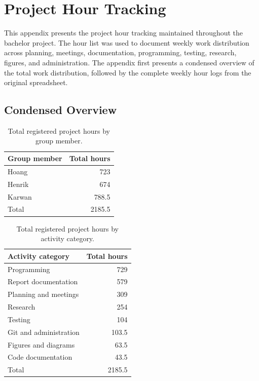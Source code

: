 
\chapter{Project Hour Tracking}
\label{app:project-hour-tracking}
\raggedbottom

This appendix presents the project hour tracking maintained throughout the bachelor project. The hour list was used to document weekly work distribution across planning, meetings, documentation, programming, testing, research, figures, and administration. The appendix first presents a condensed overview of the total work distribution, followed by the complete weekly hour logs from the original spreadsheet.

\section{Condensed Overview}
\label{appendix:project-hour-tracking-overview}

\begin{table}[htbp]
\centering
\caption{Total registered project hours by group member.}
\label{tab:project-hours-member-total}
\begin{tabular}{lr}
\toprule
Group member & Total hours \\
\midrule
Hoang & 723 \\
Henrik & 674 \\
Karwan & 788.5 \\
\midrule
Total & 2185.5 \\
\bottomrule
\end{tabular}
\end{table}

\begin{table}[htbp]
\centering
\caption{Total registered project hours by activity category.}
\label{tab:project-hours-category-total}
\begin{tabular}{lr}
\toprule
Activity category & Total hours \\
\midrule
Programming & 729 \\
Report documentation & 579 \\
Planning and meetings & 309 \\
Research & 254 \\
Testing & 104 \\
Git and administration & 103.5 \\
Figures and diagrams & 63.5 \\
Code documentation & 43.5 \\
\midrule
Total & 2185.5 \\
\bottomrule
\end{tabular}
\end{table}

